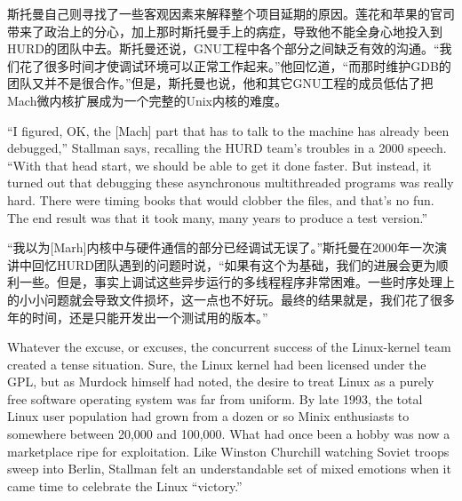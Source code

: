 \ifdefined\chs
斯托曼自己则寻找了一些客观因素来解释整个项目延期的原因。莲花和苹果的官司带来了政治上的分心，加上那时斯托曼手上的病症，导致他不能全身心地投入到HURD的团队中去。斯托曼还说，GNU工程中各个部分之间缺乏有效的沟通。``我们花了很多时间才使调试环境可以正常工作起来。''他回忆道，``而那时维护GDB的团队又并不是很合作。''但是，斯托曼也说，他和其它GNU工程的成员低估了把Mach微内核扩展成为一个完整的Unix内核的难度。
\fi

\ifdefined\eng
``I figured, OK, the [Mach] part that has to talk to the machine has already been debugged,'' Stallman says, recalling the HURD team's troubles in a 2000 speech. ``With that head start, we should be able to get it done faster. But instead, it turned out that debugging these asynchronous multithreaded programs was really hard. There were timing books that would clobber the files, and that's no fun. The end result was that it took many, many years to produce a test version.''
\fi

\ifdefined\chs
``我以为[Marh]内核中与硬件通信的部分已经调试无误了。''斯托曼在2000年一次演讲中回忆HURD团队遇到的问题时说，``如果有这个为基础，我们的进展会更为顺利一些。但是，事实上调试这些异步运行的多线程程序非常困难。一些时序处理上的小小问题就会导致文件损坏，这一点也不好玩。最终的结果就是，我们花了很多年的时间，还是只能开发出一个测试用的版本。''
\fi

\ifdefined\eng
Whatever the excuse, or excuses, the concurrent success of the Linux-kernel team created a tense situation. Sure, the Linux kernel had been licensed under the GPL, but as Murdock himself had noted, the desire to treat Linux as a purely free software operating system was far from uniform. By late 1993, the total Linux user population had grown from a dozen or so Minix enthusiasts to somewhere between 20,000 and 100,000. What had once been a hobby was now a marketplace ripe for exploitation. Like Winston Churchill watching Soviet troops sweep into Berlin, Stallman felt an understandable set of mixed emotions when it came time to celebrate the Linux ``victory.''
\fi

